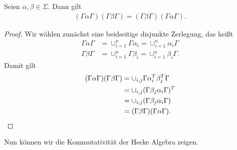 \begin{prop}
Seien $\alpha,\beta \in \Sigma$. Dann gilt
\begin{align*}
(\Gamma \alpha \Gamma)(\Gamma \beta \Gamma)=(\Gamma \beta \Gamma)(\Gamma \alpha \Gamma).
\end{align*}
\end{prop}
\begin{proof}
Wir wählen zunächst eine beidseitige disjunkte Zerlegung, das heißt
\begin{align*}
\Gamma \alpha \Gamma &=\cup_{i=1}^n \Gamma \alpha_i=\cup_{i=1}^n \alpha_i \Gamma\\
\Gamma \beta \Gamma &=\cup_{i=1}^n \Gamma \beta_i=\cup_{i=1}^n \beta_i \Gamma.
\end{align*}
Damit gilt
\begin{align*}
(\Gamma \alpha \Gamma)(\Gamma \beta \Gamma)&=\cup_{i,j} \Gamma \alpha_i^T \beta_j^T \Gamma\\
&=\cup_{i,j} (\Gamma \beta_j \alpha_i \Gamma)^T\\
&=\cup_{i,j} (\Gamma \beta_j \alpha_i \Gamma)\\
&=(\Gamma \beta \Gamma)(\Gamma \alpha \Gamma). \qedhere
\end{align*}
\end{proof}

Nun können wir die Kommutativität der Hecke Algebra zeigen.

